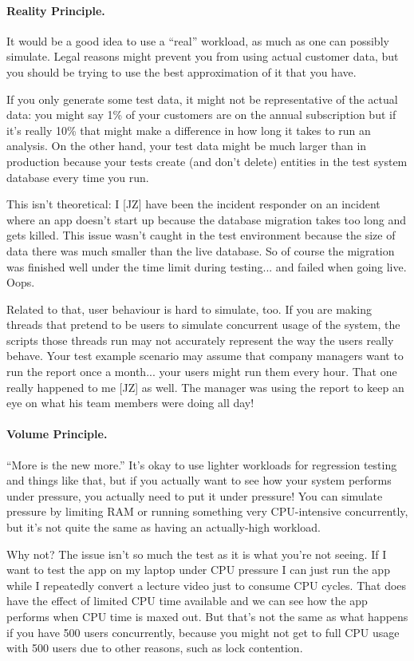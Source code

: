 \documentclass[a4paper]{report}
\begin{document}
\paragraph{Reality Principle.}
It would be a good idea to use a ``real'' workload, as much as one can possibly simulate. Legal reasons might prevent you from using actual customer data, but you should be trying to use the best approximation of it that you have. 

If you only generate some test data, it might not be representative of the actual data: you might say 1\% of your customers are on the annual subscription but if it's really 10\% that might make a difference in how long it takes to run an analysis. On the other hand, your test data might be much larger than in production because your tests create (and don't delete) entities in the test system database every time you run.

This isn't theoretical: I [JZ] have been the incident responder on an incident where an app doesn't start up because the database migration takes too long and gets killed. This issue wasn't caught in the test environment because the size of data there was much smaller than the live database. So of course the migration was finished well under the time limit during testing... and failed when going live. Oops.

Related to that, user behaviour is hard to simulate, too. If you are making threads that pretend to be users to simulate concurrent usage of the system, the scripts those threads run may not accurately represent the way the users really behave.  Your test example scenario may assume that company managers want to run the report once a month... your users might run them every hour. That one really happened to me [JZ] as well. The manager was using the report to keep an eye on what his team members were doing all day!

\paragraph{Volume Principle.}
``More is the new more.'' It's okay to use lighter workloads for regression testing and things like that, but if you actually want to see how your system performs under pressure, you actually need to put it under pressure! You can simulate pressure by limiting RAM or running something very CPU-intensive concurrently, but it's not quite the same as having an actually-high workload. 

Why not? The issue isn't so much the test as it is what you're not seeing. If I want to test the app on my laptop under CPU pressure I can just run the app while I repeatedly convert a lecture video just to consume CPU cycles. That does have the effect of limited CPU time available and we can see how the app performs when CPU time is maxed out. But that's not the same as what happens if you have 500 users concurrently, because you might not get to full CPU usage with 500 users due to other reasons, such as lock contention. 
\end{document}
